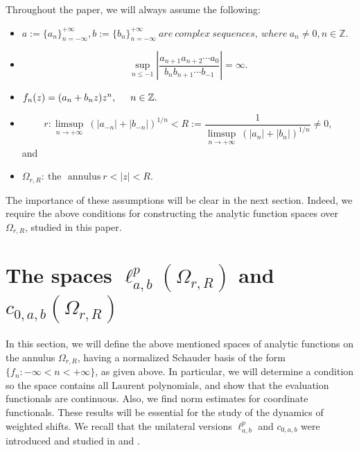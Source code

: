 \documentclass[12pt, reqno]{amsart}
\theoremstyle{definition}
\theoremstyle{remark}
\numberwithin{equation}{section}
\begin{document}
\textsf{Throughout the paper, we will always assume the following}:
\begin{itemize}
\item[(1)] 
     $a:=\{a_n\}_{n=-\infty}^{+\infty}, b:=\{b_n\}_{n=-\infty}^{+\infty}~ are~ complex~ sequences,~ where~ a_n\neq 0, n\in \mathbb{Z}.$
     \item[(2)] \[
     \sup_{n\leq -1} \left |\frac{a_{n+1}a_{n+2}\cdots a_0}{b_nb_{n+1}\cdots b_{-1}}\right|=\infty.
     \]
 \item[(3)] $
 f_n(z)=
   (a_n+b_{n}z)z^{n}, \hskip.5cm n\in \mathbb{Z}.$
\item[(4)] \begin{equation}\label{r-R}
 r:\limsup_{n\rightarrow +\infty} ~(|a_{-n}|+|b_{-n}|)^{1/n}<R:=\frac{1}{\limsup_{n\rightarrow +\infty} ~(|a_n|+|b_n|)^{1/n}}\neq 0,
\end{equation}
and 
\item[(5)]
$\Omega_{r,R}:~ \text{the~ annulus}~ r<|z|<R.$

\end{itemize}
The importance of these assumptions will be clear in the next section. Indeed, we require the above conditions for constructing the analytic function spaces over $\Omega_{r,R}$, studied in this paper. 

\section{The spaces $\ell^p_{a,b}(\Omega_{r,R})$ and $c_{0,a,b}(\Omega_{r,R})$}



In this section, we will define the above mentioned spaces of analytic functions on the annulus $\Omega_{r,R}$, having a normalized Schauder basis of the form $\{f_n:-\infty<n<+\infty\}$, as given above. In particular, we will determine a condition so the space contains all Laurent polynomials, and show that the evaluation functionals are continuous. Also, we find norm estimates for coordinate functionals. These results will be essential for the study of the dynamics of weighted shifts. We recall that the unilateral versions $\ell^p_{a,b}$ and $c_{0,a,b}$ were introduced and studied in \cite{Das-Mundayadan} and \cite{Das-Mundayadan1}. 
\end{document}
